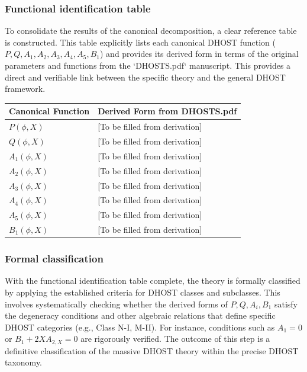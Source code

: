 \documentclass[twocolumn]{aastex631}
\begin{document}
\subsubsection{Functional identification table}
To consolidate the results of the canonical decomposition, a clear reference table is constructed. This table explicitly lists each canonical DHOST function ($P, Q, A_1, A_2, A_3, A_4, A_5, B_1$) and provides its derived form in terms of the original parameters and functions from the `DHOSTS.pdf` manuscript. This provides a direct and verifiable link between the specific theory and the general DHOST framework.

\begin{center}
\begin{tabular}{|l|l|}
\hline
Canonical Function & Derived Form from DHOSTS.pdf \\
\hline
$P(\phi,X)$ & [To be filled from derivation] \\
$Q(\phi,X)$ & [To be filled from derivation] \\
$A_1(\phi,X)$ & [To be filled from derivation] \\
$A_2(\phi,X)$ & [To be filled from derivation] \\
$A_3(\phi,X)$ & [To be filled from derivation] \\
$A_4(\phi,X)$ & [To be filled from derivation] \\
$A_5(\phi,X)$ & [To be filled from derivation] \\
$B_1(\phi,X)$ & [To be filled from derivation] \\
\hline
\end{tabular}
\end{center}

\subsubsection{Formal classification}
With the functional identification table complete, the theory is formally classified by applying the established criteria for DHOST classes and subclasses. This involves systematically checking whether the derived forms of $P, Q, A_i, B_1$ satisfy the degeneracy conditions and other algebraic relations that define specific DHOST categories (e.g., Class N-I, M-II). For instance, conditions such as $A_1=0$ or $B_1 + 2XA_{2,X}=0$ are rigorously verified. The outcome of this step is a definitive classification of the massive DHOST theory within the precise DHOST taxonomy.
\end{document}
